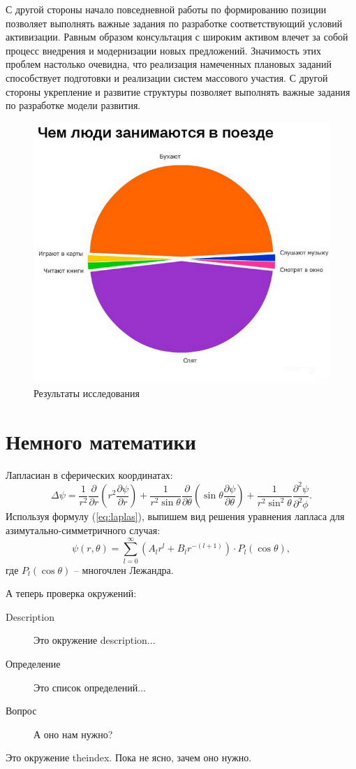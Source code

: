 \documentclass{hedsemwork}
\begin{document}
С другой стороны начало повседневной работы по формированию позиции позволяет выполнять важные задания по разработке соответствующий условий активизации. Равным образом консультация с широким активом влечет за собой процесс внедрения и модернизации новых предложений. Значимость этих проблем настолько очевидна, что реализация намеченных плановых заданий способствует подготовки и реализации систем массового участия. С другой стороны укрепление и развитие структуры позволяет выполнять важные задания по разработке модели развития.
\begin{figure}[b]
    \center
    \includegraphics[width=.47\textwidth]{2.jpg}
    \caption{Результаты исследования}
\end{figure}

\section{Немного математики}
Лапласиан в сферических координатах:
\begin{equation}
    \Delta\psi = \frac{1}{r^2}\frac{\partial}{\partial r}
    \left( r^2 \frac{\partial \psi}{\partial r} \right) +
    \frac{1}{r^2\sin\theta}\frac{\partial}{\partial\theta}
    \left(\sin\theta\frac{\partial\psi}{\partial\theta}\right) +
    \frac{1}{r^2\sin^2\theta}\frac{\partial^2\psi}{\partial^2\phi}.
    \label{eq:laplas}
\end{equation}
Используя формулу (\ref{eq:laplas}), выпишем вид решения уравнения лапласа для
азимутально-симметричного случая:
\begin{equation}
    \psi(r,\theta) = \sum_{l=0}^\infty\left(A_lr^l + B_lr^{-(l+1)}\right)\cdot
    P_l(\cos\theta),
\end{equation}
где \(P_l(\cos\theta)\) -- многочлен Лежандра.

А теперь проверка окружений:
\begin{description}
    \item[Description] Это окружение description...
    \item[Определение] Это список определений...
    \item[Вопрос] А оно нам нужно?
\end{description}
\begin{theindex}
    Это окружение theindex. Пока не ясно, зачем оно нужно.
\end{theindex}
\end{document}
